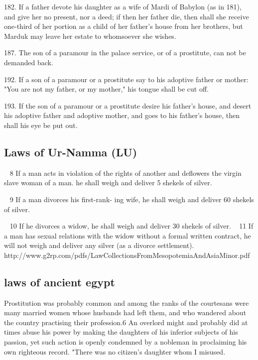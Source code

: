 \documentclass[11pt]{article}
\begin{document}
{182. If a father devote his daughter as a wife of Mardi of Babylon (as in 181), and give her no present, nor a deed; if then her father die, then shall she receive one-third of her portion as a child of her father's house from her brothers, but Marduk may leave her estate to whomsoever she wishes.

187. The son of a paramour in the palace service, or of a prostitute, can not be demanded back.

192. If a son of a paramour or a prostitute say to his adoptive father or mother: "You are not my father, or my mother," his tongue shall be cut off.

193. If the son of a paramour or a prostitute desire his father's house, and desert his adoptive father and adoptive mother, and goes to his father's house, then shall his eye be put out.








\subsection{Laws of Ur-Namma (LU) }

~ 8 If a man acts in violation of the
rights of another and deflowers the
virgin slave woman of a man. he
shall weigh and deliver 5 shekels of
silver.

~ 9 If a man divorces his first-rank-
ing wife, he shall weigh and deliver
60 shekels of silver.



~ 10 If he divorces a widow, he shall
weigh and deliver 30 shekels of silver.
~ 11 If a man has sexual relations
with the widow without a formal
written contract, he will not weigh
and deliver any silver (as a divorce
settlement).
http://www.g2rp.com/pdfs/LawCollectionsFromMesopotemiaAndAsiaMinor.pdf



\subsection{laws of ancient egypt}

Prostitution was probably common and among the
ranks of the courtesans were many married women whose husbands had
left them, and who wandered about the country practising their profession.6 An overlord might and probably did at times abuse his power by
making the daughters of his inferior subjects of his passion, yet such action is openly condemned by a nobleman in proclaiming his own righteous record. "There was no citizen's daughter whom I misused.



}
\end{document}
